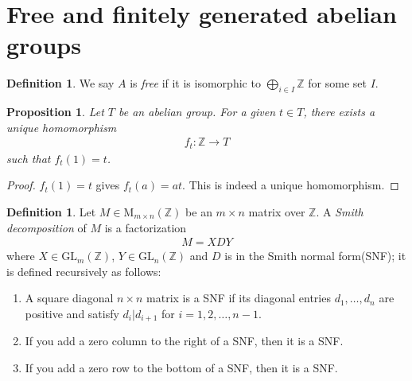 \documentclass[12pt]{report}
\theoremstyle{plain}
\newtheorem{proposition}[theorem]{Proposition}
\theoremstyle{remark}
\theoremstyle{definition}
\newtheorem{definition}[theorem]{Definition}
\newcommand{\Z}{\mathbb{Z}}
\begin{document}
\section{Free and finitely generated abelian groups}
\begin{definition}
    We say $A$ is \emph{free} if it is isomorphic to $\bigoplus_{i\in I} \Z$ for some set $I$.
\end{definition}

\begin{proposition}
    Let $T$ be an abelian group. For a given $t\in T$, there exists a unique homomorphism
    \begin{align*}
        f_t:\Z\rightarrow T
    \end{align*}
    such that $f_t(1)=t$.
\end{proposition}
\begin{proof}
    $f_t(1)=t$ gives $f_t(a)=at$. This is indeed a unique homomorphism.
\end{proof}

\begin{definition}
    Let $M\in\mathrm{M}_{m\times n}(\Z)$ be an $m\times n$ matrix over $\Z$. A \emph{Smith decomposition} of $M$ is a factorization
    \begin{align*}
        M=XDY
    \end{align*}
    where $X\in \mathrm{GL}_m(\Z)$, $Y\in\mathrm{GL}_n(\Z)$ and $D$ is in the Smith normal form(SNF); it is defined recursively as follows:
    \begin{enumerate}
        \item A square diagonal $n\times n$ matrix is a SNF if its diagonal entries $d_1,\dots,d_n$ are positive and satisfy $d_i|d_{i+1}$ for $i=1,2,\dots,n-1$.
        \item If you add a zero column to the right of a SNF, then it is a SNF.
        \item If you add a zero row to the bottom of a SNF, then it is a SNF.
    \end{enumerate}
\end{definition}
\end{document}
